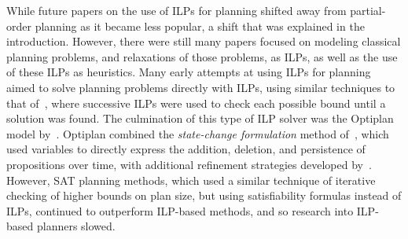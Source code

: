 While future papers on the use of ILPs for planning shifted away from partial-order planning as it became less popular, a shift that was explained in the introduction. However, there were still many papers focused on modeling classical planning problems, and relaxations of those problems, as ILPs, as well as the use of these ILPs as heuristics. Many early attempts at using ILPs for planning aimed to solve planning problems directly with ILPs, using similar techniques to that of~\cite{Bylander1997LplanHeuristic}, where successive ILPs were used to check each possible bound until a solution was found. The culmination of this type of ILP solver was the Optiplan model by~\cite{VanDenBriel2005Optiplan}. Optiplan combined the \textit{state-change formulation} method of~\cite{Vossen1999ILPModelsInPlanning}, which used variables to directly express the addition, deletion, and persistence of propositions over time, with additional refinement strategies developed by~\cite{Dimopoulos2014ImprovedILPModelsPlanning}. However, SAT planning methods, which used a similar technique of iterative checking of higher bounds on plan size, but using satisfiability formulas instead of ILPs, continued to outperform ILP-based methods, and so research into ILP-based planners slowed.\\


